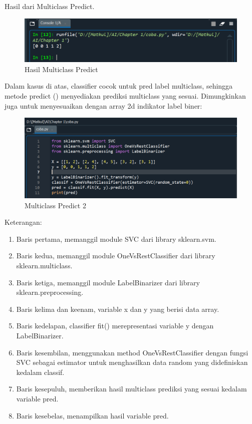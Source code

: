 \par Hasil dari Multiclass Predict.

    \begin{figure}[H]
    \centering
    \includegraphics[width=13cm]{figures/1184023/27.PNG}
    \caption{Hasil Multiclass Predict}
    \end{figure}

\par Dalam kasus di atas, classifier cocok untuk pred label multiclass, sehingga metode predict () menyediakan prediksi multiclass yang sesuai. Dimungkinkan juga untuk menyesuaikan dengan array 2d indikator label biner:

    \begin{figure}[H]
    \centering
    \includegraphics[width=13cm]{figures/1184023/28.PNG}
    \caption{Multiclass Predict 2}
    \end{figure}
    
\par Keterangan:
    \begin{enumerate}
        \item Baris pertama, memanggil module SVC dari library sklearn.svm.
        \item Baris kedua, memanggil module OneVsRestClassifier dari library sklearn.multiclass.
        \item Baris ketiga, memanggil module LabelBinarizer dari library sklearn.preprocessing.
        \item Baris kelima dan keenam, variable x dan y yang berisi data array.
        \item Baris kedelapan, classifier fit() merepresentasi variable y dengan LabelBinarizer.
        \item Baris kesembilan, menggunakan method OneVsRestClassifier dengan fungsi SVC sebagai estimator untuk menghasilkan data random yang didefiniskan kedalam classif.
        \item Baris kesepuluh, memberikan hasil multiclass prediksi yang sesuai kedalam variable pred.
        \item Baris kesebelas, menampilkan hasil variable pred. 
    \end{enumerate}

